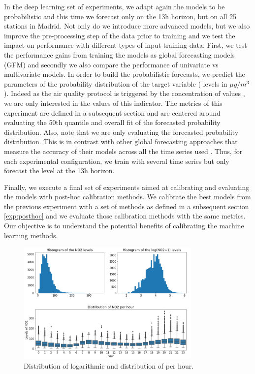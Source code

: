 \documentclass[12pt,a4paper]{book}
\begin{document}
In the deep learning set of experiments, we adapt again the models to be probabilistic and this time we forecast only on the 13h horizon, but on all 25 stations in Madrid. Not only do we introduce more advanced models, but we also improve the pre-processing step of the data prior to training and we test the impact on performance with different types of input training data. First, we test the performance gains from training the models as global forecasting models (GFM) and secondly we also compare the performance of univariate vs multivariate models. In order to build the probabilistic forecasts, we predict the parameters of the probability distribution of the target variable (\no{} levels in $\mu g/m^3$).  Indeed as the air quality protocol is triggered by the concentration of \no{} values \cite{madrid_protocolo_no}, we are only interested in the values of this indicator. The metrics of this experiment are defined in a subsequent section and are centered around evaluating the 50th quantile and overall fit of the forecasted probability distribution. Also, note that we are only evaluating the forecasted \no{} probability distribution. This is in contrast with other global forecasting approaches that measure the accuracy of their models across all the time series used \citep[e.g.,][]{hewamalage_advancing_2022,makridakis_m5_2022}. Thus, for each experimental configuration, we train with several time series but only forecast the \no{} level at the 13h horizon.

Finally, we execute a final set of experiments aimed at calibrating and evaluating the models with post-hoc calibration methods. We calibrate the best models from the previous experiment with a set of methods as defined in a subsequent section \ref{exp:posthoc} and we evaluate those calibration methods with the same metrics. Our objective is to understand the potential benefits of calibrating the machine learning methods. 

\begin{figure}
  \centering
  \includegraphics[width=0.8\textwidth]{histo_variance}
  \caption{\label{figure:histo_variance}Distribution of logarithmic
    \no{} and distribution of \no{}
    per hour.}
\end{figure}
\end{document}
